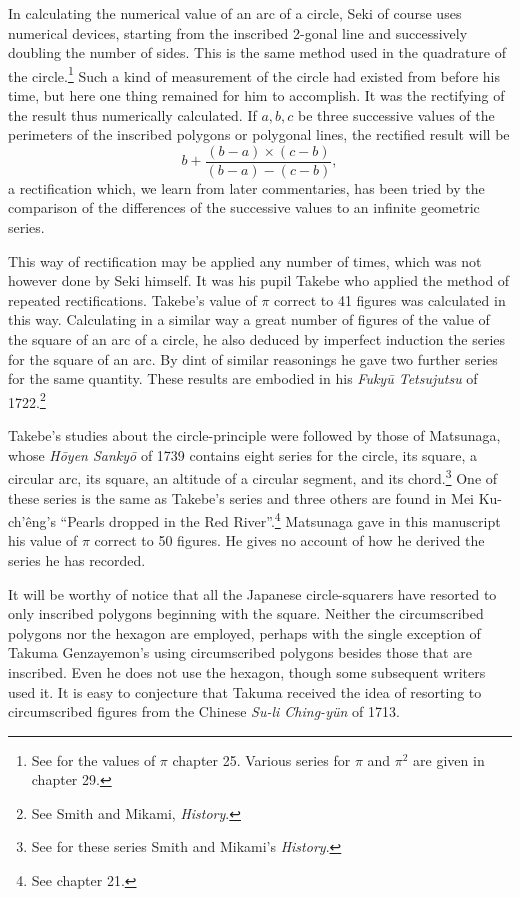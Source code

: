 \documentclass[11pt]{article}
\newcommand{\scanpage}[2]{\clearpage\setcounter{footnote}{0}\noindent{\footnotesize\color{gray}PDF page #1 · #2}\par\medskip}
\newcommand{\scanfooter}{}
\begin{document}
In calculating the numerical value of an arc of a circle, Seki of course uses numerical devices, starting from the inscribed 2-gonal line and successively doubling the number of sides. This is the same method used in the quadrature of the circle.\footnote{See for the values of $\pi$ chapter 25. Various series for $\pi$ and $\pi^2$ are given in chapter 29.} Such a kind of measurement of the circle had existed from before his time, but here one thing remained for him to accomplish. It was the rectifying of the result thus numerically calculated. If $a,b,c$ be three successive values of the perimeters of the inscribed polygons or polygonal lines, the rectified result will be
\[
b+\frac{(b-a)\times(c-b)}{(b-a)-(c-b)},
\]
a rectification which, we learn from later commentaries, has been tried by the comparison of the differences of the successive values to an infinite geometric series.

This way of rectification may be applied any number of times, which was not however done by Seki himself. It was his pupil Takebe who applied the method of repeated rectifications. Takebe's value of $\pi$ correct to 41 figures was calculated in this way. Calculating in a similar way a great number of figures of the value of the square of an arc of a circle, he also deduced by imperfect induction the series for the square of an arc. By dint of similar reasonings he gave two further series for the same quantity. These results are embodied in his \emph{Fukyū Tetsujutsu} of 1722.\footnote{See Smith and Mikami, \emph{History}.}
\scanfooter

\scanpage{0180}{Chapter 22, printed page 166}
Takebe's studies about the circle-principle were followed by those of Matsunaga, whose \emph{Hōyen Sankyō} of 1739 contains eight series for the circle, its square, a circular arc, its square, an altitude of a circular segment, and its chord.\footnote{See for these series Smith and Mikami's \emph{History}.} One of these series is the same as Takebe's series and three others are found in Mei Ku-ch'êng's ``Pearls dropped in the Red River''.\footnote{See chapter 21.} Matsunaga gave in this manuscript his value of $\pi$ correct to 50 figures. He gives no account of how he derived the series he has recorded.

It will be worthy of notice that all the Japanese circle-squarers have resorted to only inscribed polygons beginning with the square. Neither the circumscribed polygons nor the hexagon are employed, perhaps with the single exception of Takuma Genzayemon's using circumscribed polygons besides those that are inscribed. Even he does not use the hexagon, though some subsequent writers used it. It is easy to conjecture that Takuma received the idea of resorting to circumscribed figures from the Chinese \emph{Su-li Ching-yün} of 1713.
\end{document}
